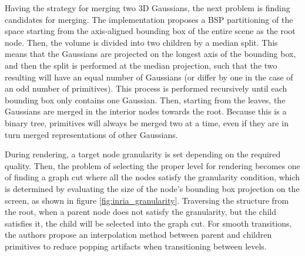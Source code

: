 Having the strategy for merging two 3D Gaussians, the next problem is finding candidates for merging. The implementation proposes a BSP partitioning of the space starting from the axis-aligned bounding box of the entire scene as the root node. Then, the volume is divided into two children by a median split. This means that the Gaussians are projected on the longest axis of the bounding box, and then the split is performed at the median projection, such that the two resulting will have an equal number of Gaussians (or differ by one in the case of an odd number of primitives). This process is performed recursively until each bounding box only contains one Gaussian. Then, starting from the leaves, the Gaussians are merged in the interior nodes towards the root. Because this is a binary tree, primitives will always be merged two at a time, even if they are in turn merged representations of other Gaussians.

During rendering, a target node granularity is set depending on the required quality. Then, the problem of selecting the proper level for rendering becomes one of finding a graph cut where all the nodes satisfy the granularity condition, which is determined by evaluating the size of the node's bounding box projection on the screen, as shown in figure \ref{fig:inria_granularity}. Traversing the structure from the root, when a parent node does not satisfy the granularity, but the child satisfies it, the child will be selected into the graph cut. For smooth transitions, the authors propose an interpolation method between parent and children primitives to reduce popping artifacts when transitioning between levels.

